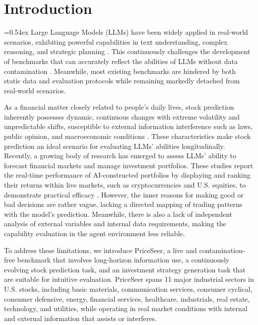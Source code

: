 \documentclass[conference]{IEEEtran}
\begin{document}
\section{Introduction}
\label{sec:intro}
\font=0.54ex
Large Language Models (LLMs) have been widely applied in real-world scenarios, exhibiting powerful capabilities in text understanding, complex reasoning, and strategic planning \cite{GPT-5,Gemini-2.5-pro,DeepSeek-R1,chen2025just}. This continuously challenges the development of benchmarks that can accurately reflect the abilities of LLMs without data contamination \cite{chen2025can,chen2025maceval,chen2025evaluating,zhang2025large}.
Meanwhile, most existing benchmarks are hindered by both static data and evaluation protocols while remaining markedly detached from real-world scenarios. 

As a financial matter closely related to people's daily lives, stock prediction inherently possesses dynamic, continuous changes with extreme volatility and unpredictable shifts, susceptible to external information interference such as laws, public opinion, and macroeconomic conditions \cite{koa2024learning}. These characteristics make stock prediction an ideal scenario for evaluating LLMs' abilities longitudinally. 
Recently, a growing body of research \cite{lopez2023can,xie2023pixiu,FinCon,fatouros2024can} has emerged to assess LLMs’ ability to forecast financial markets and manage investment portfolios. These studies report the real-time performance of AI-constructed portfolios by displaying and ranking their returns within live markets, such as cryptocurrencies and U.S. equities, to demonstrate practical efficacy \cite{AI-Trader, AlphaArena, LiveTradeBench}.
However, the inner reasons for making good or bad decisions are rather vague, lacking a directed mapping of trading patterns with the model's prediction. Meanwhile, there is also a lack of independent analysis of external variables and internal data requirements, making the capability evaluation in the agent environment less reliable.

To address these limitations, we introduce PriceSeer, a live and contamination-free benchmark that involves long-horizon information use, a continuously evolving stock prediction task, and an investment strategy generation task that are suitable for intuitive evaluation. PriceSeer spans 11 major industrial sectors in U.S. stocks, including basic materials, communication services, consumer cyclical, consumer defensive, energy, financial services, healthcare, industrials, real estate, technology, and utilities, while operating in real market conditions with internal and external information that assists or interferes.
\end{document}
